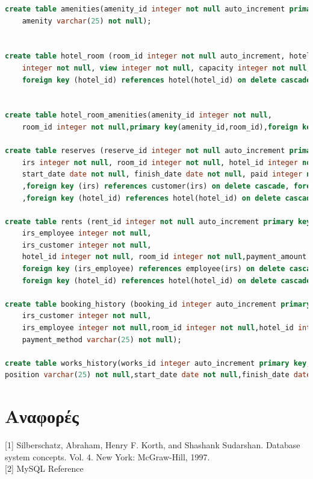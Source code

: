 \documentclass[a4paper,oneside, 11pt]{article}
\begin{document}
\begin{lstlisting}[language=SQL]
create table amenities(amenity_id integer not null auto_increment primary key,
	amenity varchar(25) not null);


create table hotel_room (room_id integer not null auto_increment, hotel_id integer not null,price float not null, repairs_needed integer not null, expandable 
	integer not null, view integer not null, capacity integer not null,primary key (room_id, hotel_id),
	foreign key (hotel_id) references hotel(hotel_id) on delete cascade);


create table hotel_room_amenities(amenity_id integer not null,
	room_id integer not null,primary key(amenity_id,room_id),foreign key (amenity_id) references amenities(amenity_id) on delete cascade, foreign key (room_id) references hotel_room(room_id) on delete cascade);

create table reserves (reserve_id integer not null auto_increment primary key,
	irs integer not null, room_id integer not null, hotel_id integer not null, 
	start_date date not null, finish_date date not null, paid integer not null
	,foreign key (irs) references customer(irs) on delete cascade, foreign key (room_id) references hotel_room(room_id) on delete cascade
	,foreign key (hotel_id) references hotel(hotel_id) on delete cascade);

create table rents (rent_id integer not null auto_increment primary key,
	irs_employee integer not null,
	irs_customer integer not null,
	hotel_id integer not null, room_id integer not null,payment_amount float not null, payment_method varchar(25),start_date date not null,finish_date date not null,
	foreign key (irs_employee) references employee(irs) on delete cascade, foreign key (irs_customer) references customer(irs) on delete cascade,
	foreign key (hotel_id) references hotel(hotel_id) on delete cascade, foreign key (room_id) references hotel_room(room_id) on delete cascade);

create table booking_history (booking_id integer auto_increment primary key,
	irs_customer integer not null,
	irs_employee integer not null,room_id integer not null,hotel_id integer not null,hotel_group_id integer not null,start_date date not null,finish_date date not null,
	payment_method varchar(25) not null);

create table works_history(works_id integer auto_increment primary key,irs_employee integer not null,hotel_id integer not null,hotel_group_id integer not null,
position varchar(25) not null,start_date date not null,finish_date date not null);

\end{lstlisting}



\section{Αναφορές}

[1] Silberschatz, Abraham, Henry F. Korth, and Shashank Sudarshan. Database system concepts. Vol. 4. New York: McGraw-Hill, 1997. \noindent \\

[2] MySQL Reference
\end{document}
